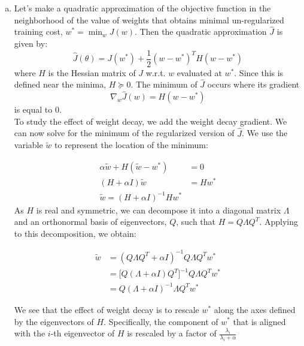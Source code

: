 \documentclass[fleqn]{article}
\DeclareMathOperator*{\argmin}{min}
\begin{document}
\begin{enumerate}[a)]
	\item
	Let's make a quadratic approximation of the objective function in the neighborhood of the value of weights that obtains minimal un-regularized training cost, $w^* = \argmin_w J(w)$. Then the quadratic approximation $\hat{J}$ is given by:
	\begin{equation*}
		\hat{J}(\theta) = J(w^*) + \frac{1}{2} (w - w^*)^T H (w - w^*)
	\end{equation*}
where $H$ is the Hessian matrix of $J$ w.r.t. $w$ evaluated at $w^*$. Since this is defined near the minima, $H \succeq 0 $. The minimum of $\hat{J}$ occurs where its gradient
	\begin{equation*}
		\nabla_w \hat{J}(w) = H (w - w^*)
	\end{equation*}
is equal to 0. \\
To study the effect of weight decay, we add the weight decay gradient. We can now solve for the minimum of the regularized version of $\hat{J}$. We use the variable $\tilde{w}$ to represent the location of the minimum:

\begin{align*}
	\alpha \tilde{w} + H(\tilde{w} - w^*) &= 0 \\
	(H + \alpha I) \tilde{w} &= H w^*\\
	\tilde{w} = (H + \alpha I)^{-1} Hw^*
\end{align*}
As $H$ is real and symmetric, we can decompose it into a diagonal matrix $\Lambda$ and an orthonormal basis of eigenvectors, $Q$, such that $H = Q\Lambda Q^T$. Applying to this decomposition, we obtain:

\begin{align*}
	\tilde{w} &= (Q \Lambda Q^T + \alpha I)^{-1} Q \Lambda Q^T w^*\\
	&= \big[ Q(\Lambda + \alpha I)Q^T \big]^{-1} Q \Lambda Q^T w^*\\
	&= Q(\Lambda + \alpha I)^{-1} \Lambda Q^T w^*
\end{align*}

We see that the effect of weight decay is to rescale $w^*$ along the axes defined by the eigenvectors of $H$. Specifically, the component of $w^*$ that is aligned with the $i$-th eigenvector of $H$ is rescaled by a factor of $\frac{\lambda_i}{\lambda_i + \alpha}$


\end{enumerate}
\end{document}
